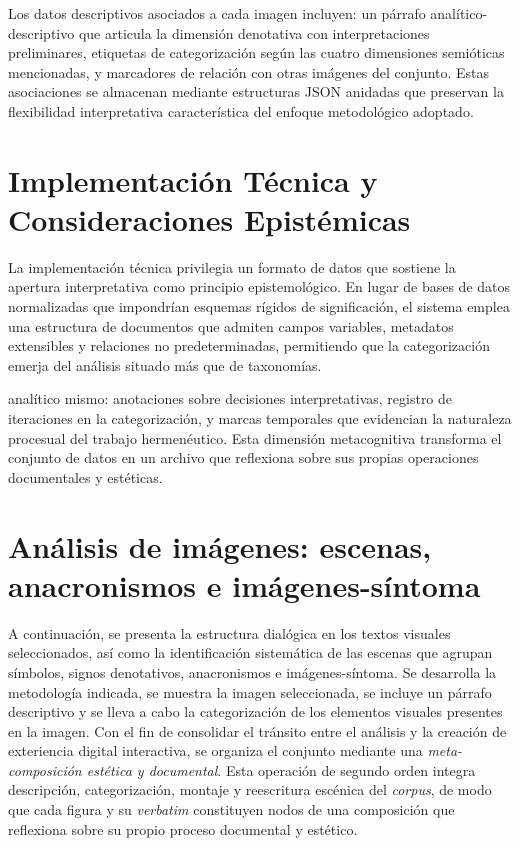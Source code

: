 \textcolor{edit30sept}{Los datos descriptivos asociados a cada imagen incluyen: un párrafo analítico-descriptivo que articula la dimensión denotativa con interpretaciones preliminares, etiquetas de categorización según las cuatro dimensiones semióticas mencionadas, y marcadores de relación con otras imágenes del conjunto. Estas asociaciones se almacenan mediante estructuras JSON anidadas que preservan la flexibilidad interpretativa característica del enfoque metodológico adoptado.}

\section{Implementación Técnica y Consideraciones Epistémicas}

\textcolor{edit30sept}{La implementación técnica privilegia un formato de datos que sostiene la apertura interpretativa como principio epistemológico. En lugar de bases de datos normalizadas que impondrían esquemas rígidos de significación, el sistema emplea una estructura de documentos que admiten campos variables, metadatos extensibles y relaciones no predeterminadas, permitiendo que la categorización emerja del análisis situado más que de taxonomías.}

\textcolor{edit30sept}{analítico mismo: anotaciones sobre decisiones interpretativas, registro de iteraciones en la categorización, y marcas temporales que evidencian la naturaleza procesual del trabajo hermenéutico. Esta dimensión metacognitiva transforma el conjunto de datos en un archivo que reflexiona sobre sus propias operaciones documentales y estéticas.}

\section{Análisis de imágenes: escenas, anacronismos e imágenes-síntoma}

A continuación, se presenta la estructura dialógica en los textos visuales seleccionados, así como la identificación sistemática de las escenas que agrupan símbolos, signos denotativos, anacronismos e imágenes-síntoma. Se desarrolla la metodología indicada, se muestra la imagen seleccionada, se incluye un párrafo descriptivo y se lleva a cabo la categorización de los elementos visuales presentes en la imagen. \textcolor{edit30sept}{Con el fin de consolidar el tránsito entre el análisis y la creación de exteriencia digital interactiva, se organiza el conjunto mediante una \textit{meta-composición estética y documental}. Esta operación de segundo orden integra descripción, categorización, montaje y reescritura escénica del \textit{corpus}, de modo que cada figura y su \textit{verbatim} constituyen nodos de una composición que reflexiona sobre su propio proceso documental y estético.}

